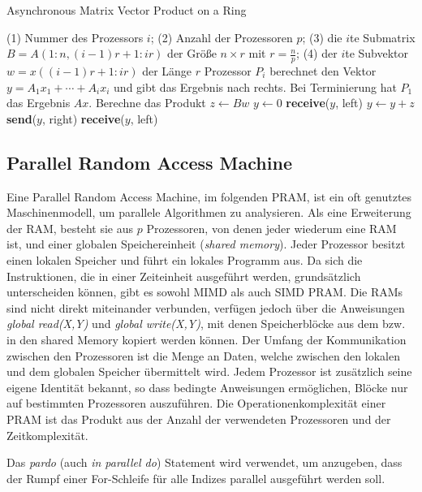 \begin{algorithm}
    \caption{Asynchronous Matrix Vector Product on a Ring \cite[S.18]{jaja}}
    \begin{algorithmic}[1]
    \Require (1) Nummer des Prozessors $i$; (2) Anzahl der Prozessoren $p$;
    (3) die $i$te Submatrix $B = A(1:n, (i-1)r+1:ir)$ der Größe $n \times r$
        mit $r = \frac{n}{p}$;
    (4) der $i$te Subvektor $w = x((i-1)r+1:ir)$ der Länge $r$
    \Ensure Prozessor $P_i$ berechnet den Vektor $y = A_1x_1 + \cdots + A_ix_i$
    und gibt das Ergebnis nach rechts. Bei Terminierung hat $P_1$ das
    Ergebnis $Ax$.
    \State Berechne das Produkt $z \gets Bw$
        \State $y \gets 0$
    \Else
        \State \textbf{receive}($y$, left)
    \EndIf
    \State $y \gets y + z$
    \State \textbf{send}($y$, right)
        \State \textbf{receive}($y$, left)
    \EndIf
    \end{algorithmic}
\end{algorithm}


\subsection{Parallel Random Access Machine}
Eine Parallel Random Access Machine, im folgenden PRAM, ist ein oft genutztes
Maschinenmodell, um parallele Algorithmen zu analysieren.
Als eine Erweiterung der RAM, besteht sie aus $p$ Prozessoren, von denen jeder
wiederum eine RAM ist, und einer globalen Speichereinheit
(\emph{shared memory}).
Jeder Prozessor besitzt einen lokalen Speicher und führt ein lokales Programm
aus.
Da sich die Instruktionen, die in einer Zeiteinheit ausgeführt werden,
grundsätzlich unterscheiden können, gibt es sowohl MIMD als auch SIMD PRAM.
Die RAMs sind nicht direkt miteinander verbunden, verfügen jedoch über die
Anweisungen \emph{global read(X,Y)} und \emph{global write(X,Y)}, mit denen
Speicherblöcke aus dem bzw. in den shared Memory kopiert werden können.
Der Umfang der Kommunikation zwischen den Prozessoren ist die Menge an Daten,
welche zwischen den lokalen und dem globalen Speicher übermittelt wird.
Jedem Prozessor ist zusätzlich seine eigene Identität bekannt, so dass bedingte
Anweisungen ermöglichen, Blöcke nur auf bestimmten Prozessoren auszuführen.
Die Operationenkomplexität einer PRAM ist das Produkt aus der Anzahl der
verwendeten Prozessoren und der Zeitkomplexität.
\cite[S.9ff.]{jaja}

Das \emph{pardo} (auch \emph{in parallel do}) Statement wird verwendet, um
anzugeben, dass der Rumpf einer For-Schleife für alle Indizes parallel
ausgeführt werden soll.

